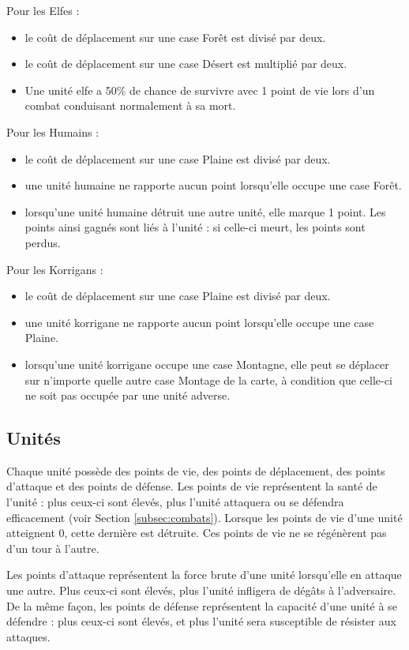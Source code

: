 		Pour les Elfes :
		\begin{itemize}
			\item le coût de déplacement sur une case Forêt est divisé par deux. 
			\item le coût de déplacement sur une case Désert est multiplié par deux.
			\item Une unité elfe a 50\% de chance de survivre avec 1 point de vie lors d’un combat conduisant normalement à sa mort.
		\end{itemize}
		
		Pour les Humains :
		\begin{itemize}
			\item le coût de déplacement sur une case Plaine est divisé par deux.
			\item une unité humaine ne rapporte aucun point lorsqu'elle occupe une case Forêt.
			\item lorsqu’une unité humaine détruit une autre unité, elle marque 1 point. Les points ainsi gagnés sont liés à l'unité : si celle-ci meurt, les points sont perdus.
		\end{itemize}
		
		Pour les Korrigans :
		\begin{itemize}
			\item le coût de déplacement sur une case Plaine est divisé par deux.
			\item une unité korrigane ne rapporte aucun point lorsqu'elle occupe une case Plaine.
			\item lorsqu'une unité korrigane occupe une case Montagne, elle peut se déplacer sur n’importe quelle autre case Montage de la carte, à condition que celle-ci ne soit pas occupée par une unité adverse.
		\end{itemize}

	\subsection{Unités}
	Chaque unité possède des points de vie, des points de déplacement, des points d'attaque et des points de défense. Les points de vie représentent la santé de l'unité : plus ceux-ci sont élevés, plus l'unité attaquera ou se défendra efficacement (voir Section \ref{subsec:combats}). Lorsque les points de vie d'une unité atteignent 0, cette dernière est détruite. Ces points de vie ne se régénèrent pas d'un tour à l'autre.
	
	Les points d'attaque représentent la force brute d'une unité lorsqu'elle en attaque une autre.  Plus ceux-ci sont élevés, plus l'unité infligera de dégâts à l'adversaire. De la même façon, les points de défense représentent la capacité d'une unité à se défendre : plus ceux-ci sont élevés, et plus l'unité sera susceptible de résister aux attaques. 
	
